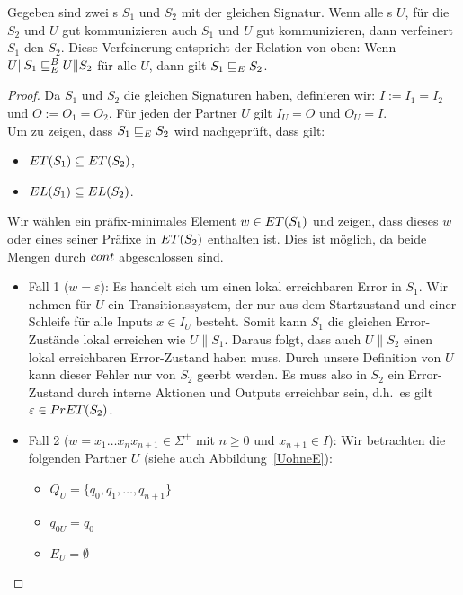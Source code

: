 \begin{lem}
  \label{lemVerfeinerung}
  Gegeben sind zwei \EIO{}s $S_1$ und $S_2$ mit der gleichen Signatur. Wenn alle
  \EIO{}s $U$, für die $S_2$ und $U$ gut kommunizieren auch $S_1$
  und $U$ gut kommunizieren, dann verfeinert $S_1$ den \EIO{} $S_2$. Diese Verfeinerung
  entspricht der Relation \ERel{} von oben: Wenn $U\|S_1 \sqsubseteq _E^B U\|S_2$ für alle
  $U$, dann gilt $S_1\sqsubseteq _E S_2$.
\end{lem}

\begin{proof}
  Da $S_1$ und $S_2$ die gleichen Signaturen haben, definieren wir:
  $I:=I_1=I_2$ und $O:=O_1=O_2$. Für jeden der Partner $U$ gilt $I_U=O$ und
  $O_U=I$.\\
  Um zu zeigen, dass $S_1\sqsubseteq _E S_2$ wird nachgeprüft, dass gilt:
  \begin{itemize}
    \item $ET{}(S_1)\subseteq ET{}(S_2)$,
    \item $EL{}(S_1)\subseteq EL{}(S_2)$.
  \end{itemize}
  Wir wählen ein präfix-minimales Element $w\in ET{}(S_1)$ und
  zeigen, dass dieses $w$ oder eines seiner Präfixe in $ET{}(S_2)$ enthalten ist.
  Dies ist möglich, da beide Mengen durch $cont{}$ abgeschlossen sind.
  \begin{itemize}
    \item Fall 1 ($w=\varepsilon$): Es handelt sich um einen lokal erreichbaren
      Error in $S_1$.
      Wir nehmen für $U$ ein Transitionssystem, der nur aus dem Startzustand und
      einer Schleife für alle Inputs $x\in I_U$ besteht. Somit kann $S_1$ die gleichen
      Error-Zustände lokal erreichen wie $U\|S_1$. Daraus folgt, dass auch
      $U\|S_2$ einen lokal erreichbaren Error-Zustand haben muss. Durch unsere
      Definition von $U$ kann dieser Fehler nur von $S_2$ geerbt werden. Es
      muss also in $S_2$ ein Error-Zustand durch interne Aktionen und Outputs
      erreichbar sein, d.h.\ es gilt $\varepsilon\in PrET{}(S_2)$.
    \item Fall 2 ($w=x_1\dots x_n x_{n+1}\in\Sigma ^+$ mit $n\geq 0$ und
      $x_{n+1}\in I$): Wir betrachten die folgenden Partner $U$ (siehe auch
      Abbildung~\ref{UohneE}):
      \begin{itemize}
        \item $Q_U=\{q_0,q_1,\dots ,q_{n+1}\}$
        \item $q_{0U}=q_0$
        \item $E_U=\emptyset$

\end{itemize}
\end{itemize}
\end{proof}
